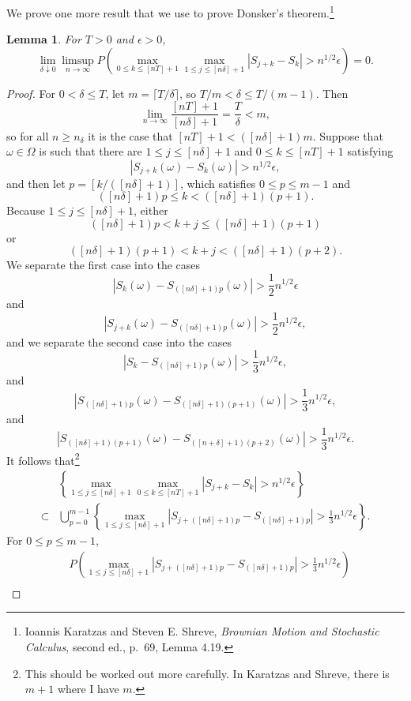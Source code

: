 \documentclass{article}
\newtheorem{lemma}[theorem]{Lemma}
\theoremstyle{definition}
\begin{document}
We prove one more result that we use to prove Donsker's theorem.\footnote{Ioannis Karatzas and Steven E. Shreve,
{\em Brownian Motion and Stochastic Calculus}, second ed., p.~69, Lemma 4.19.}

\begin{lemma}
For $T>0$ and $\epsilon>0$,
\[
\lim_{\delta \downarrow 0} \limsup_{n \to \infty} P\left( \max_{0 \leq k \leq [nT]+1}
\max_{1 \leq j \leq [n\delta]+1} |S_{j+k}-S_k| > n^{1/2} \epsilon \right) = 0.
\]
\label{lemma419}
\end{lemma}
\begin{proof}
For $0<\delta \leq T$, let $m = \lceil T/\delta \rceil$, so $T/m < \delta \leq T/(m-1)$. 
Then
\[
\lim_{n \to \infty} \frac{[nT]+1}{[n\delta]+1} = \frac{T}{\delta}<m,
\]
so for all $n \geq n_\delta$ it is the case that $[nT]+1 < ([n\delta]+1)m$. 
Suppose that $\omega \in \Omega$ is such that there are
$1 \leq j \leq [n\delta]+1$
and $0 \leq k \leq [nT]+1$ satisfying
\[
|S_{j+k}(\omega) - S_k(\omega)| > n^{1/2} \epsilon,
\]
 and  then let  $p=[k/([n\delta]+1)]$,
which satisfies
$0 \leq p \leq m-1$ and
\[
([n\delta]+1)p \leq k < ([n\delta]+1)(p+1).
\]
Because $1 \leq j \leq [n\delta]+1$, either
\[
([n\delta]+1)p < k+j \leq ([n\delta]+1)(p+1)
\]
or
\[
([n\delta]+1)(p+1) < k+j < ([n\delta]+1)(p+2).
\]
We separate the first case into the cases
\[
|S_k(\omega)-S_{([n\delta]+1)p}(\omega)| > \frac{1}{2}n^{1/2} \epsilon
\]
and
 \[
 |S_{j+k}(\omega) - S_{([n\delta]+1)p}(\omega)| > \frac{1}{2}n^{1/2}\epsilon,
 \]
and we separate the second case into the cases 
\[
|S_k-S_{([n\delta]+1)p}(\omega)| > \frac{1}{3}n^{1/2} \epsilon,
\]
and
\[ 
|S_{([n\delta]+1)p}(\omega) - S_{([n\delta]+1)(p+1)}(\omega)| > \frac{1}{3}n^{1/2} \epsilon,
\]
 and
\[
|S_{([n\delta]+1)(p+1)}(\omega) - S_{([n+\delta]+1)(p+2)}(\omega)| > \frac{1}{3}n^{1/2} \epsilon.
\] 
It follows that\footnote{This should be worked out more carefully. In Karatzas and Shreve, there is $m+1$ where I have $m$.}
\[
\begin{split}
&\left\{ \max_{1 \leq j \leq [n\delta]+1} \max_{0 \leq k \leq [nT]+1} |S_{j+k}-S_k| > n^{1/2} \epsilon\right\}\\
\subset&\bigcup_{p=0}^{m-1} \left\{ \max_{1 \leq j \leq [n\delta]+1} |S_{j+([n\delta]+1)p}-S_{([n\delta]+1)p}| > \frac{1}{3}n^{1/2}\epsilon\right\}.
\end{split}
\]
For $0 \leq p \leq m-1$,
\[
\begin{split}
&P\left( \max_{1 \leq j \leq [n\delta]+1} |S_{j+([n\delta]+1)p} - S_{([n\delta]+1)p}| > \frac{1}{3}n^{1/2}\epsilon\right)\\

\end{split}\]
\end{proof}
\end{document}
